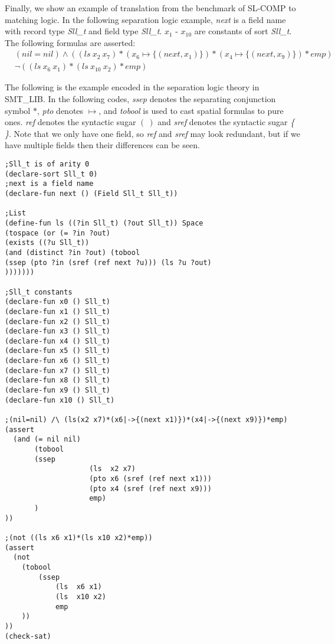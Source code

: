 \documentclass{article}
\theoremstyle{plain}
\begin{document}
Finally, we show an example of translation from the benchmark of SL-COMP to matching logic. In the following separation logic example, \textit{next} is a field name with record type \textit{Sll\_t} and field type \textit{Sll\_t}. $x_1$ - $x_{10}$ are constants of sort \textit{Sll\_t}. The following formulas are asserted:
\begin{equation*}
\begin{split}
&(\mathit{nil} = \mathit{nil}) \wedge ((\mathit{ls}\ x_2\ x_7) * (x_6 \mapsto \{(\mathit{next},x_1)\}) * (x_4 \mapsto \{(\mathit{next},x_9)\}) *\mathit{emp}) \\  &\neg((\mathit{ls}\ x_6\ x_1) *(\mathit{ls}\ x_{10}\ x_2) *\mathit{emp})
\end{split}
\end{equation*}

The following is the example encoded in the separation logic theory in SMT\_LIB. In the following codes, \textit{ssep} denotes the separating conjunction symbol $*$, \textit{pto} denotes $\mapsto$, and \textit{tobool} is used to cast spatial formulas to pure ones. \textit{ref} denotes the syntactic sugar $\mathit{(\ )}$ and \textit{sref} denotes the syntactic sugar \textit{\{ \}}. Note that we only have one field, so \textit{ref} and \textit{sref} may look redundant, but if we have multiple fields then their differences can be seen.
\begin{verbatim}
;Sll_t is of arity 0
(declare-sort Sll_t 0)
;next is a field name
(declare-fun next () (Field Sll_t Sll_t))

;List
(define-fun ls ((?in Sll_t) (?out Sll_t)) Space
(tospace (or (= ?in ?out)
(exists ((?u Sll_t))
(and (distinct ?in ?out) (tobool
(ssep (pto ?in (sref (ref next ?u))) (ls ?u ?out)
)))))))

;Sll_t constants
(declare-fun x0 () Sll_t)
(declare-fun x1 () Sll_t)
(declare-fun x2 () Sll_t)
(declare-fun x3 () Sll_t)
(declare-fun x4 () Sll_t)
(declare-fun x5 () Sll_t)
(declare-fun x6 () Sll_t)
(declare-fun x7 () Sll_t)
(declare-fun x8 () Sll_t)
(declare-fun x9 () Sll_t)
(declare-fun x10 () Sll_t)

;(nil=nil) /\ (ls(x2 x7)*(x6|->{(next x1)})*(x4|->{(next x9)})*emp) 
(assert
  (and (= nil nil)
       (tobool 
       (ssep
		            (ls  x2 x7) 
		            (pto x6 (sref (ref next x1))) 
		            (pto x4 (sref (ref next x9))) 
		            emp)
	   )  
))

;(not ((ls x6 x1)*(ls x10 x2)*emp))
(assert
  (not
    (tobool 
	    (ssep
       		(ls  x6 x1) 
       		(ls  x10 x2) 
       		emp
	))
))
(check-sat)

\end{verbatim}
\end{document}
